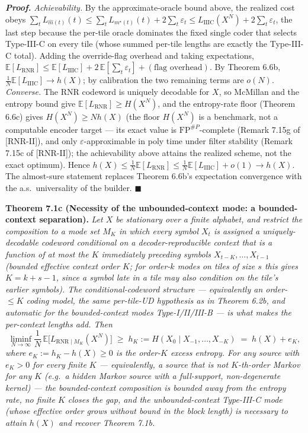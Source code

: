 \documentclass[
]{article}
\begin{document}
\emph{\textbf{Proof.}} \emph{Achievability.} By the approximate-oracle
bound above, the realized cost obeys $\sum_t L_{\hat m(t)}(t) \le
\sum_t L_{m^\star(t)}(t) + 2\sum_t \varepsilon_t \le
L_{\mathrm{IIIC}}(X^N) + 2\sum_t \varepsilon_t$, the last step because
the per-tile oracle dominates the fixed single coder that selects
Type-III-C on every tile (whose summed per-tile lengths are exactly the
Type-III-C total). Adding the override-flag overhead and taking
expectations, $\mathbb{E}[L_{\mathrm{RNR}}] \le \mathbb{E}[L_{\mathrm{IIIC}}]
+ 2\,\mathbb{E}[\sum_t \varepsilon_t] + (\text{flag overhead})$. By
Theorem 6.6b, $\tfrac1N \mathbb{E}[L_{\mathrm{IIIC}}] \to h(X)$; by
calibration the two remaining terms are $o(N)$. \emph{Converse.} The RNR
codeword is uniquely decodable for $X$, so McMillan and the entropy
bound give $\mathbb{E}[L_{\mathrm{RNR}}] \ge H(X^N)$, and the
entropy-rate floor (Theorem 6.6c) gives $H(X^N) \ge N h(X)$ (the floor
$H(X^N)$ is a benchmark, not a computable encoder target --- its exact
value is $\mathrm{FP}^{\#P}$-complete (Remark 7.15g of [RNR-II]), and only
$\varepsilon$-approximable in poly time under filter stability (Remark
7.15c of [RNR-II]); the achievability above attains the realized scheme, not the exact
optimum). Hence
$h(X) \le \tfrac1N \mathbb{E}[L_{\mathrm{RNR}}] \le \tfrac1N
\mathbb{E}[L_{\mathrm{IIIC}}] + o(1) \to h(X)$. The almost-sure statement
replaces Theorem 6.6b's expectation convergence with the a.s.\
universality of the builder. \hfill$\blacksquare$

\textbf{Theorem 7.1c (Necessity of the unbounded-context mode: a
bounded-context separation).} \emph{Let $X$ be stationary over a finite
alphabet, and restrict the composition to a mode set $M_K$ in which every
symbol $X_t$ is assigned a uniquely-decodable codeword conditional on a
decoder-reproducible context that is a function of at most the $K$
immediately preceding symbols $X_{t-K},\ldots,X_{t-1}$ (bounded effective
context order $K$; for order-$k$ modes on tiles of size $s$ this gives
$K = k + s - 1$, since a symbol late in a tile may also condition on the
tile's earlier symbols). The conditional-codeword structure --- equivalently
an order-$\le\!K$ coding model, the same per-tile-UD hypothesis as in
Theorem 6.2b, and automatic for the bounded-context modes
Type-I/II/III-B --- is what makes the per-context lengths add. Then}
\[
\liminf_{N\to\infty} \frac1N \, \mathbb{E}\bigl[L_{\mathrm{RNR}\mid M_K}(X^N)\bigr]
\;\ge\; h_K := H(X_0 \mid X_{-1},\ldots,X_{-K}) \;=\; h(X) + e_K,
\]
\emph{where $e_K := h_K - h(X) \ge 0$ is the order-$K$ excess entropy. For
any source with $e_K > 0$ for every finite $K$ --- equivalently, a source
that is not $K$-th-order Markov for any $K$ (e.g.\ a hidden Markov source
with a full-support, non-degenerate kernel) --- the bounded-context
composition is bounded away from the entropy rate, no finite $K$ closes
the gap, and the unbounded-context Type-III-C mode (whose effective order
grows without bound in the block length) is necessary to attain $h(X)$
and recover Theorem 7.1b.}
\end{document}
